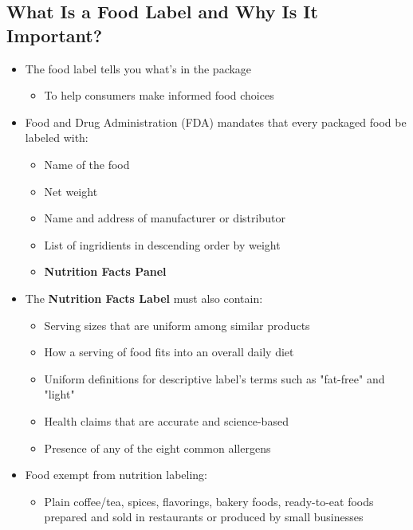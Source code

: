 \documentclass[12pt]{article}
\begin{document}
        \subsection{What Is a Food Label and Why Is It Important?}
            \begin{itemize}
                \item The food label tells you what's in the package
                    \begin{itemize}
                        \item To help consumers make informed food choices
                    \end{itemize}
                \item Food and Drug Administration (FDA) mandates that every packaged food be labeled with:
                    \begin{itemize}
                        \item Name of the food
                        \item Net weight
                        \item Name and address of manufacturer or distributor
                        \item List of ingridients in descending order by weight
                        \item \textbf{Nutrition Facts Panel}
                    \end{itemize}
                \item The \textbf{Nutrition Facts Label} must also contain:
                    \begin{itemize}
                        \item Serving sizes that are uniform among similar products
                        \item How a serving of food fits into an overall daily diet
                        \item Uniform definitions for descriptive label's terms such as "fat-free" and "light"
                        \item Health claims that are accurate and science-based
                        \item Presence of any of the eight common allergens
                    \end{itemize}
                \item Food exempt from nutrition labeling:
                    \begin{itemize}
                        \item Plain coffee/tea, spices, flavorings, bakery foods, ready-to-eat foods prepared and sold in restaurants or produced by small businesses

\end{itemize}
\end{itemize}
\end{document}
